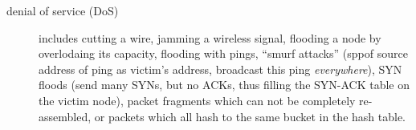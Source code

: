 \documentclass[12pt]{article}
\begin{document}
\begin{description}
\item[denial of service (DoS)] includes cutting a wire, jamming a wireless signal, flooding a node by overlodaing its capacity, flooding with pings, ``smurf attacks'' (sppof source address of ping as victim's address, broadcast this ping \emph{everywhere}), SYN floods (send many SYNs, but no ACKs, thus filling the SYN-ACK table on the victim node), packet fragments which can not be completely re-assembled, or packets which all hash to the same bucket in the hash table.
\end{description}
\end{document}
